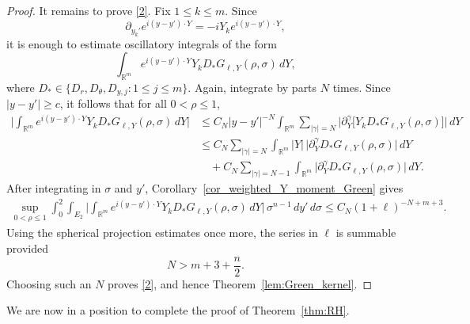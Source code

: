 \documentclass[12pt]{amsart}
\begin{document}
\begin{proof}
It remains to prove \eqref{2}. Fix $1\le k \le m$. Since
\begin{equation*}
    \partial_{y_k'}e^{i(y-y')\cdot Y}
    =
    -iY_k e^{i(y-y')\cdot Y},
\end{equation*}
it is enough to estimate oscillatory integrals of the form
\begin{equation*}
    \int_{\mathbb R^m}
        e^{i(y-y')\cdot Y}
        Y_k D_*G_{\ell,Y}(\rho,\sigma) \, dY,
\end{equation*}
where $D_*\in\{D_r,D_\theta,D_{y,j}:1\le j\le m\}$. Again, integrate by parts $N$ times. Since
$|y-y'|\ge c$, it follows that for all $0<\rho \le 1$,
\begin{align*}
    \biggl|\int_{\mathbb R^m} e^{i(y-y')\cdot Y} Y_k D_*G_{\ell,Y}(\rho,\sigma) \, dY \biggr|
    &\le C_N |y-y'|^{-N} \int_{\mathbb R^m} \sum_{|\gamma|=N} \bigl| \partial_Y^\gamma \bigl[ Y_k D_*G_{\ell,Y}(\rho,\sigma)\bigr]\bigr| \, dY\\
    &\le C_N \sum_{|\gamma|=N} \int_{\mathbb R^m}|Y|\,\bigl|\partial_Y^\gamma D_*G_{\ell,Y}(\rho,\sigma)\bigr| \, dY\\
    &\quad+ C_N\sum_{|\gamma|=N-1} \int_{\mathbb R^m}\bigl|\partial_Y^\gamma D_*G_{\ell,Y}(\rho,\sigma)\bigr| \, dY.
\end{align*}
After integrating in $\sigma$ and $y'$, Corollary~\ref{cor_weighted_Y_moment_Green} gives
\begin{align*}
    \sup_{0<\rho\leq1}
    \int_0^2
    \int_{E_2}
    \biggl|
    \int_{\mathbb R^m}
        e^{i(y-y')\cdot Y}
        Y_k D_*G_{\ell,Y}(\rho,\sigma) \, dY
    \biggr|
    \,\sigma^{n-1}\,dy'\,d\sigma \le C_N(1+\ell)^{-N+m+3}.
\end{align*}
Using the spherical projection estimates once more, the series in $\ell$ is summable provided
\begin{equation*}
    N>m+3+\frac{n}{2}.
\end{equation*}
Choosing such an $N$ proves \eqref{2}, and hence Theorem~\ref{lem:Green_kernel}.
\end{proof}

We are now in a position to complete the proof of Theorem~\ref{thm:RH}.
\end{document}
